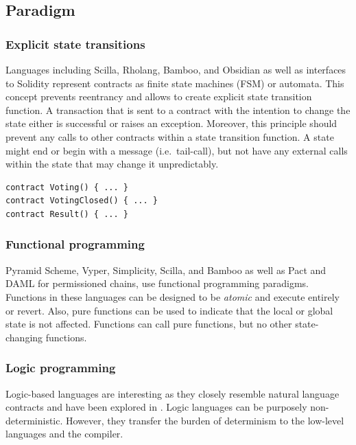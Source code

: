 \subsection{Paradigm}

\subsubsection{Explicit state transitions}
Languages including Scilla, Rholang, Bamboo, and Obsidian as well as interfaces to Solidity \cite{Mavridou2018} represent contracts as finite state machines (FSM) or automata. This concept prevents reentrancy and allows to create explicit state transition function. A transaction that is sent to a contract with the intention to change the state either is successful or raises an exception. Moreover, this principle should prevent any calls to other contracts within a state transition function. A state might end or begin with a message (i.e.\ tail-call), but not have any external calls within the state that may change it unpredictably.

\begin{lstlisting}[caption={A separation of states represented in Bamboo, where each state represents a different contract at the same address.},label=lst:fsm,language=Solidity]
contract Voting() { ... }
contract VotingClosed() { ... }
contract Result() { ... }
\end{lstlisting}

\subsubsection{Functional programming}
Pyramid Scheme, Vyper, Simplicity, Scilla, and Bamboo as well as Pact and DAML for permissioned chains, use functional programming paradigms. Functions in these languages can be designed to be \emph{atomic} and execute entirely or revert. Also, pure functions can be used to indicate that the local or global state is not affected. Functions can call pure functions, but no other state-changing functions.

\subsubsection{Logic programming}
Logic-based languages are interesting as they closely resemble natural language contracts and have been explored in \cite{Idelberger2016}. Logic languages can be purposely non-deterministic. However, they transfer the burden of determinism to the low-level languages and the compiler.


